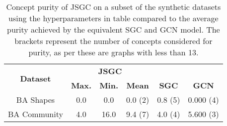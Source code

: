 \begin{table}
    \centering
    \begin{tabular}{c|ccc|cc}
        \multirow{2}{*}{\textbf{Dataset}} &
        \multicolumn{3}{c|}{\textbf{JSGC}} & \\
        & \textbf{Max.} & \textbf{Min.} & \textbf{Mean} & 
        \multirow{-2}{*}{\textbf{SGC}} &
        \multirow{-2}{*}{\textbf{GCN}}\\
        \midrule
        BA Shapes       & 0.0 & 0.0 & 0.0 (2) & 0.8 (5) & 0.000 (4) \\
        BA Community    & 4.0 & 16.0 & 9.4 (7) & 4.0 (4) & 5.600 (3) \\
    \end{tabular}
    \caption{Concept purity of JSGC on a subset of the synthetic datasets using the hyperparameters in table  compared to the average purity achieved by the equivalent SGC and GCN model. The brackets represent the number of concepts considered for purity, as per  these are graphs with less than 13.}
    \label{tab:JSGC-purity}
\end{table}

